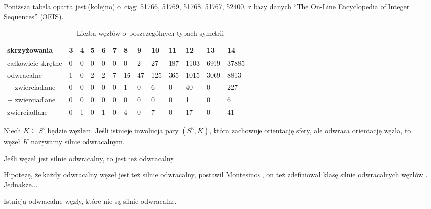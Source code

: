Poniższa tabela oparta jest (kolejno) o~ciągi
\href{https://oeis.org/A051766}{51766},
\href{https://oeis.org/A051769}{51769},
\href{https://oeis.org/A051768}{51768},
\href{https://oeis.org/A051767}{51767},
\href{https://oeis.org/A052400}{52400},
z bazy danych ``The On-Line Encyclopedia of Integer Sequences'' (OEIS).

\begin{table}[h]
    \centering
    \begin{tabular}{@{}*{20}l@{}} \toprule
        skrzyżowania & 3 & 4 & 5 & 6 & 7 & 8 & 9 & 10 & 11 & 12 & 13 & 14 \\ \midrule
        całkowicie skrętne & 0 & 0 & 0 & 0 & 0 & 0 & 2 & 27 & 187 & 1103 & 6919 & 37885 \\
        odwracalne & 1 & 0 & 2 & 2 & 7 & 16 & 47 & 125 & 365 & 1015 & 3069 & 8813 \\
        $-$ zwierciadlane & 0 & 0 & 0 & 0 & 0 & 1 & 0 & 6 & 0 & 40 & 0 & 227 \\
        $+$ zwierciadlane & 0 & 0 & 0 & 0 & 0 & 0 & 0 & 0 & 0 & 1 & 0 & 6 \\
        zwierciadlane & 0 & 1 & 0 & 1 & 0 & 4 & 0 & 7 & 0 & 17 & 0 & 41 \\
        \bottomrule
        \hline
    \end{tabular}
    \caption{Liczba węzłów o~poszczególnych typach symetrii}
\end{table}

\begin{definition}
    Niech $K \subseteq S^3$ będzie węzłem.
    Jeśli istnieje inwolucja pary $(S^3, K)$, która zachowuje orientację sfery, ale odwraca orientację węzła, to węzeł $K$ nazywamy silnie odwracalnym.
\end{definition}

\begin{proposition}
    Jeśli węzeł jest silnie odwracalny, to jest też odwracalny.
\end{proposition}

Hipotezę, że każdy odwracalny węzeł jest też silnie odwracalny, postawił Montesinos \cite[problem 1.6]{kirby1978}, on też zdefiniował klasę silnie odwracalnych węzłów \cite{montesinos1975}.
%
Jednakże...

\begin{proposition}
    Istnieją odwracalne węzły, które nie są silnie odwracalne.
\end{proposition}

